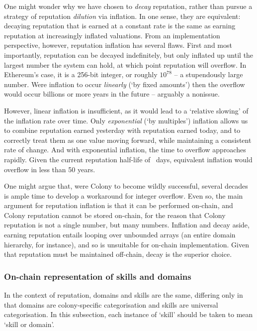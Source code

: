 One might wonder why we have chosen to \textit{decay} reputation, rather than pursue a strategy of reputation \textit{dilution} via inflation. In one sense, they are equivalent: decaying reputation that is earned at a constant rate is the same as earning reputation at increasingly inflated valuations. From an implementation perspective, however, reputation inflation has several flaws. First and most importantly, reputation can be decayed indefinitely, but only inflated up until the largest number the system can hold, at which point reputation will overflow. In Ethereum's case, it is a 256-bit integer, or roughly $10^{78}$ -- a stupendously large number. Were inflation to occur \textit{linearly} (`by fixed amounts') then the overflow would occur billions or more years in the future -- arguably a nonissue.

However, linear inflation is insufficient, as it would lead to a `relative slowing' of the inflation rate over time. Only \textit{exponential} (`by multiples') inflation allows us to combine reputation earned yesterday with reputation earned today, and to correctly treat them as one value moving forward, while maintaining a consistent rate of change. And with exponential inflation, the time to overflow approaches rapidly. Given the current reputation half-life of \repdecayduration\ days, equivalent inflation would overflow in less than 50 years.

One might argue that, were Colony to become wildly successful, several decades is ample time to develop a workaround for integer overflow. Even so, the main argument for reputation inflation is that it can be performed on-chain, and Colony reputation cannot be stored on-chain, for the reason that Colony reputation is not a single number, but many numbers. Inflation and decay aside, earning reputation entails looping over unbounded arrays (an entire domain hierarchy, for instance), and so is unsuitable for on-chain implementation. Given that reputation must be maintained off-chain, decay is the superior choice.

\subsubsection{On-chain representation of skills and domains}\label{subsec:on-chain-representation-of-skills}

In the context of reputation, domains and skills are the same, differing only in that domains are colony-specific categorisation and skills are universal categorisation. In this subsection, each instance of `skill' should be taken to mean `skill or domain'.

